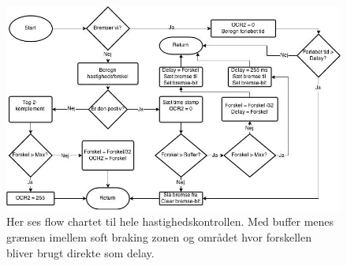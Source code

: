 \begin{figure}[h]

	\centering
		\includegraphics[scale=0.4]{Billeder/Speed.jpg}
	\caption{Her ses flow chartet til hele hastighedskontrollen. Med buffer menes grænsen imellem soft braking zonen og området hvor forskellen bliver brugt direkte som delay.}
	\label{fig:Speed}
	
\end{figure}

